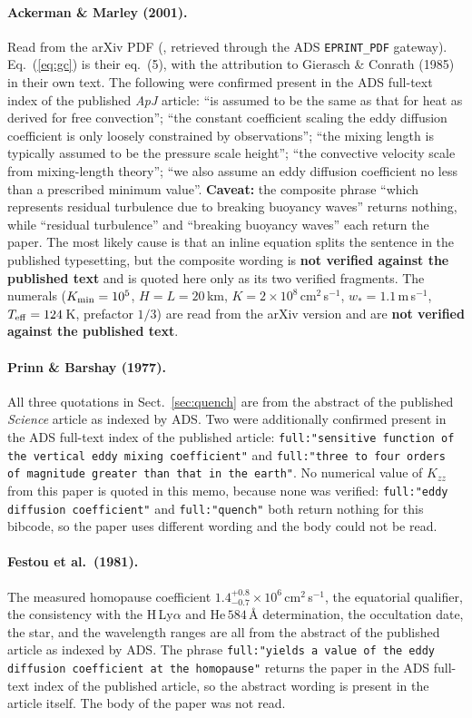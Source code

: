 \documentclass[english,a4paper]{my_memo}
\begin{document}
\paragraph{Ackerman \& Marley (2001).} Read from the arXiv PDF
(, retrieved through the ADS
\texttt{EPRINT\_PDF} gateway). Eq.~(\ref{eq:gc}) is their eq.~(5), with the
attribution to Gierasch \& Conrath (1985) in their own text. The following
were confirmed present in the ADS full-text index of the published
\emph{ApJ} article: ``is assumed to be the same as that for heat as derived
for free convection''; ``the constant coefficient scaling the eddy diffusion
coefficient is only loosely constrained by observations''; ``the mixing
length is typically assumed to be the pressure scale height''; ``the
convective velocity scale from mixing-length theory''; ``we also assume an
eddy diffusion coefficient no less than a prescribed minimum value''.
\textbf{Caveat:} the composite phrase ``which represents residual
turbulence due to breaking buoyancy waves'' returns nothing, while
``residual turbulence'' and ``breaking buoyancy waves'' each return the
paper. The most likely cause is that an inline equation splits the sentence
in the published typesetting, but the composite wording is
\textbf{not verified against the published text} and is quoted here only as
its two verified fragments. The numerals ($K_{\rm min} = 10^{5}$,
$H = L = 20$\,km, $K = 2\times10^{8}$\,cm$^{2}$\,s$^{-1}$, $w_* =
1.1$\,m\,s$^{-1}$, $T_{\rm eff} = 124$\,K, prefactor $1/3$) are read from
the arXiv version and are \textbf{not verified against the published text}.

\paragraph{Prinn \& Barshay (1977).} All three quotations in
Sect.~\ref{sec:quench} are from the abstract of the published \emph{Science}
article as indexed by ADS. Two were additionally confirmed present in the
ADS full-text index of the published article: \texttt{full:"sensitive
function of the vertical eddy mixing coefficient"} and \texttt{full:"three
to four orders of magnitude greater than that in the earth"}. No numerical
value of $K_{zz}$ from this paper is quoted in this memo, because none was
verified: \texttt{full:"eddy diffusion coefficient"} and
\texttt{full:"quench"} both return nothing for this bibcode, so the paper
uses different wording and the body could not be read.

\paragraph{Festou et al.\ (1981).} The measured homopause coefficient
$1.4^{+0.8}_{-0.7}\times10^{6}$\,cm$^{2}$\,s$^{-1}$, the equatorial
qualifier, the consistency with the H\,Ly$\alpha$ and He\,$584$\,\AA{}
determination, the occultation date, the star, and the wavelength ranges are
all from the abstract of the published article as indexed by ADS. The phrase
\texttt{full:"yields a value of the eddy diffusion coefficient at the
homopause"} returns the paper in the ADS full-text index of the published
article, so the abstract wording is present in the article itself.
The body of the paper was not read.
\end{document}
